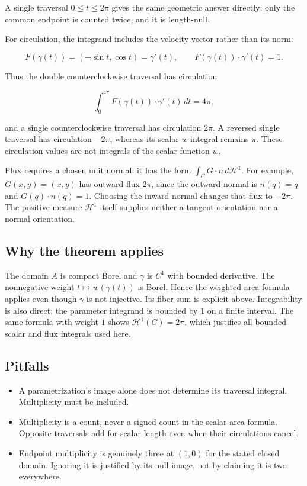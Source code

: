 \documentclass[
  11pt,
]{article}
\providecommand{\tightlist}{%
  \setlength{\itemsep}{0pt}\setlength{\parskip}{0pt}}
\begin{document}
A single traversal \(0\leq t\leq2\pi\) gives the same geometric answer
directly: only the common endpoint is counted twice, and it is
length-null.

For circulation, the integrand includes the velocity vector rather than
its norm:

\[
F(\gamma(t))=(-\sin t,\cos t)=\gamma'(t),
\qquad F(\gamma(t))\cdot\gamma'(t)=1.
\]

Thus the double counterclockwise traversal has circulation

\[
\int_0^{4\pi}F(\gamma(t))\cdot\gamma'(t)\,dt=\boxed{4\pi},
\]

and a single counterclockwise traversal has circulation \(2\pi\). A
reversed single traversal has circulation \(-2\pi\), whereas its scalar
\(w\)-integral remains \(\pi\). These circulation values are not
integrals of the scalar function \(w\).

Flux requires a chosen unit normal: it has the form
\(\int_C G\cdot n\,d\mathcal H^1\). For example, \(G(x,y)=(x,y)\) has
outward flux \(2\pi\), since the outward normal is \(n(q)=q\) and
\(G(q)\cdot n(q)=1\). Choosing the inward normal changes that flux to
\(-2\pi\). The positive measure \(\mathcal H^1\) itself supplies neither
a tangent orientation nor a normal orientation.

\subsection{Why the theorem applies}\label{why-the-theorem-applies-7}

The domain \(A\) is compact Borel and \(\gamma\) is \(C^1\) with bounded
derivative. The nonnegative weight \(t\mapsto w(\gamma(t))\) is Borel.
Hence the weighted area formula applies even though \(\gamma\) is not
injective. Its fiber sum is explicit above. Integrability is also
direct: the parameter integrand is bounded by \(1\) on a finite
interval. The same formula with weight \(1\) shows
\(\mathcal H^1(C)=2\pi\), which justifies all bounded scalar and flux
integrals used here.

\subsection{Pitfalls}\label{pitfalls-7}

\begin{itemize}
\tightlist
\item
  A parametrization's image alone does not determine its traversal
  integral. Multiplicity must be included.
\item
  Multiplicity is a count, never a signed count in the scalar area
  formula. Opposite traversals add for scalar length even when their
  circulations cancel.
\item
  Endpoint multiplicity is genuinely three at \((1,0)\) for the stated
  closed domain. Ignoring it is justified by its null image, not by
  claiming it is two everywhere.
\end{itemize}
\end{document}
